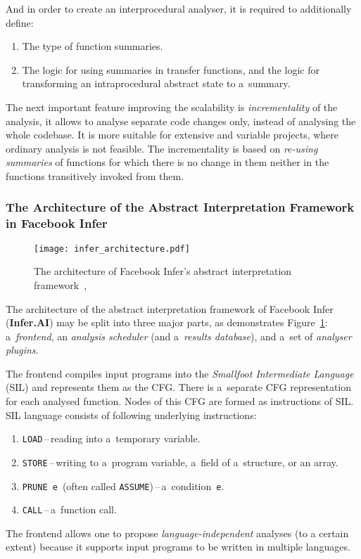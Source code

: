 And in order to create an interprocedural analyser, it is required to
additionally define:
\begin{enumerate}
    \item
        The type of function summaries.

    \item
        The logic for using summaries in transfer functions, and the logic
        for transforming an intraprocedural abstract state to
        a~summary.
\end{enumerate}
The next important feature improving the scalability is
\emph{incrementality} of the analysis, it allows to analyse separate
code changes only, instead of analysing the whole codebase. It is more
suitable for extensive and variable projects, where ordinary analysis
is not feasible. The incrementality is based on \emph{re-using summaries}
of functions for which there is no change in them neither in the functions
transitively invoked from them.

\subsubsection*{
    The Architecture of the Abstract Interpretation Framework in
    Facebook Infer
}

\begin{figure}[hbt]
    \centering
    \texttt{[image: infer\_architecture.pdf]}
    \caption{
        The architecture of Facebook Infer's abstract interpretation
        framework~\cite{inferAISlides}, \cite{projectPracticeMarcin2018}
    }
    \label{fig:inferArchitecture}
\end{figure}

The architecture of the abstract interpretation framework of Facebook
Infer (\textbf{Infer.AI}) may be split into three major parts,
as demonstrates Figure~\ref{fig:inferArchitecture}: a~\emph{frontend},
an \emph{analysis scheduler} (and a~\emph{results database}), and a~set of
\emph{analyser plugins}.

The frontend compiles input programs into the \emph{Smallfoot Intermediate
Language} (SIL) and represents them as the CFG. There is a~separate CFG
representation for each analysed function. Nodes of this CFG are formed as
instructions of SIL. SIL language consists of following underlying
instructions:
\begin{enumerate}
    \item
        \texttt{LOAD}\,--\,reading into a~temporary variable.

    \item
        \texttt{STORE}\,--\,writing to a~program variable,
        a~field of a~structure, or an array.

    \item
        \texttt{PRUNE~e}~(often called
        \texttt{ASSUME})\,--\,a~condition~\texttt{e}.

    \item
        \texttt{CALL}\,--\,a~function call.
\end{enumerate}
The frontend allows one to propose \emph{language-independent} analyses
(to a certain extent) because it supports input programs to be written
in multiple languages.

